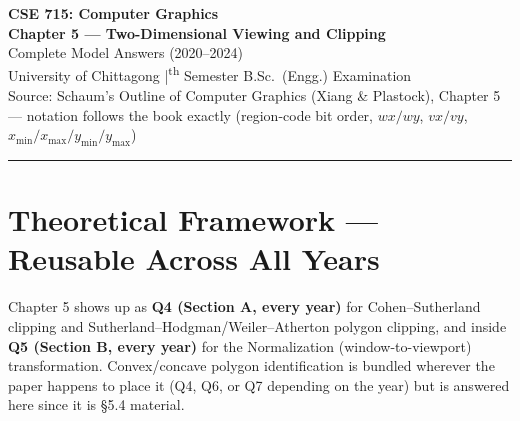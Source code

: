\documentclass[12pt, a4paper]{article}
\begin{document}

\begin{center}
  {\LARGE\bfseries\color{sectionblue} CSE 715: Computer Graphics}\\[0.6em]
  {\Large\bfseries Chapter 5 --- Two-Dimensional Viewing and Clipping}\\[0.3em]
  {\large Complete Model Answers (2020--2024)}\\[0.2em]
  {\normalsize University of Chittagong \quad|\textsuperscript{th} Semester B.Sc.\ (Engg.) Examination}\\[0.3em]
  {\small Source: Schaum's Outline of Computer Graphics (Xiang \& Plastock), Chapter 5 --- notation follows the book exactly (region-code bit order, $wx/wy$, $vx/vy$, $x_{\min}/x_{\max}/y_{\min}/y_{\max}$)}
\end{center}

\vspace{0.3em}
\noindent\rule{\linewidth}{1pt}
\vspace{0.5em}

\tableofcontents
\newpage

\section{Theoretical Framework --- Reusable Across All Years}
Chapter 5 shows up as \textbf{Q4 (Section A, every year)} for Cohen--Sutherland clipping and Sutherland--Hodgman/Weiler--Atherton polygon clipping, and inside \textbf{Q5 (Section B, every year)} for the Normalization (window-to-viewport) transformation. Convex/concave polygon identification is bundled wherever the paper happens to place it (Q4, Q6, or Q7 depending on the year) but is answered here since it is §5.4 material.

\end{document}
